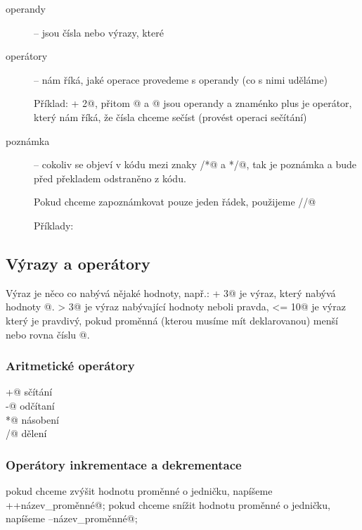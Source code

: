 \begin{description}
\item[operandy] -- jsou čísla nebo výrazy, které  

\item[operátory] -- nám říká, jaké operace provedeme s operandy (co s nimi uděláme) 

Příklad:  + 2@, přitom @ a @ jsou operandy a znaménko plus je operátor, který nám říká, že čísla chceme sečíst (provést operaci sečítání)


\item[poznámka] -- cokoliv se objeví v kódu mezi znaky \verb@/*@  a \verb@*/@, tak je poznámka a bude před překladem odstraněno z kódu. 

Pokud chceme zapoznámkovat pouze jeden řádek, použijeme \verb@//@

Příklady:






\end{description}


\subsection{Výrazy a operátory}

Výraz je něco co nabývá nějaké hodnoty, např.:  + 3@ je výraz, 
který nabývá hodnoty @.  > 3@ je výraz nabývající hodnoty \verb@true@ neboli pravda, 
\verb@x <= 10@ je výraz který je pravdivý, pokud proměnná \verb@x@(kterou musíme mít deklarovanou) menší nebo rovna číslu @. 

\subsubsection{Aritmetické operátory}
\verb@+@ sčítání \\
\verb@-@ odčítaní \\
\verb@*@ násobení \\
\verb@/@ dělení \\

\subsubsection{Operátory inkrementace a dekrementace}
pokud chceme zvýšit hodnotu proměnné o jedničku, napíšeme 
\verb@++název_proměnné@;
pokud chceme snížit hodnotu proměnné o jedničku, napíšeme \verb@--název_proměnné@;

